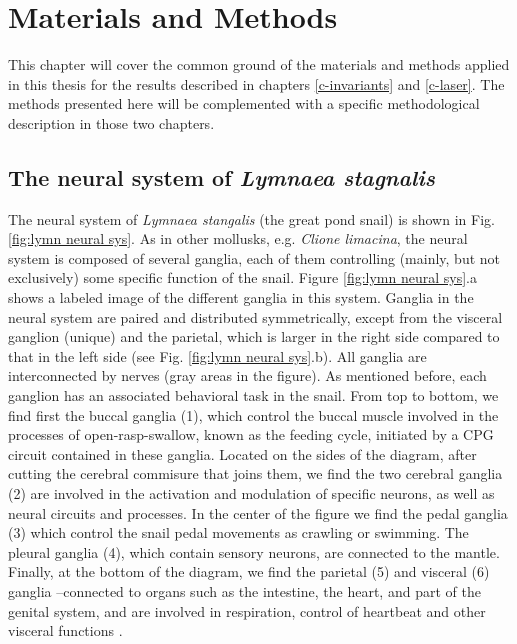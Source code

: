\chapter{Materials and Methods}
This chapter will cover the common ground of the materials and methods applied in this thesis for the results described in chapters \ref{c-invariants} and \ref{c-laser}. The methods presented here will be complemented with a specific methodological description in those two chapters.

\section{The neural system of \textit{Lymnaea stagnalis}}
\label{sec:lymnaea morphology}
The neural system of \textit{Lymnaea stangalis} (the great pond snail) is shown in Fig. \ref{fig:lymn neural sys}. As in other mollusks, e.g. {\sl Clione limacina}, the neural system is composed of several ganglia, each of them controlling (mainly, but not exclusively) some specific function of the snail. Figure \ref{fig:lymn neural sys}.a shows a labeled image of the different ganglia in this system. Ganglia in the neural system are paired and distributed symmetrically, except from the visceral ganglion (unique) and the parietal, which is larger in the right side compared to that in the left side (see Fig. \ref{fig:lymn neural sys}.b). All ganglia are interconnected by nerves (gray areas in the figure). As mentioned before, each ganglion has an associated behavioral task in the snail. From top to bottom, we find first the buccal ganglia (1), which control the buccal muscle involved in the processes of open-rasp-swallow, known as the feeding cycle, initiated by a CPG circuit contained in these ganglia. Located on the sides of the diagram, after cutting the cerebral commisure that joins them, we find the two cerebral ganglia (2) are involved in the activation and modulation of specific neurons, as well as neural circuits and processes. In the center of the figure we find the pedal ganglia (3) which control the snail pedal movements as crawling or swimming.  The pleural ganglia (4), which contain sensory neurons, are connected to the mantle. Finally, at the bottom of the diagram, we find the parietal (5) and visceral (6) ganglia --connected to organs such as the intestine, the heart, and part of the genital system, and are involved in respiration, control of heartbeat and other visceral functions \parencite{benjamin_lymnaea_2008}.


